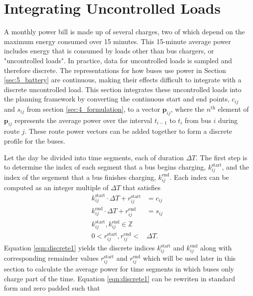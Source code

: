 \section{Integrating Uncontrolled Loads\label{sec:uncontrolled}}
A monthly power bill is made up of several charges, two of which depend on the maximum energy consumed over 15 minutes. This 15-minute average power includes energy that is consumed by loads other than bus chargers, or "uncontrolled loads". In practice, data for uncontrolled loads is sampled and therefore discrete. The representations for how buses use power in Section \ref{sec:5_battery} are continuous, making their effects difficult to integrate with a discrete uncontrolled load. This section integrates these uncontrolled loads into the planning framework by converting the continuous start and end points, $c_{ij}$ and $s_{ij}$ from section \ref{sec:4_formulation}, to a vector $\mathbf{p}_{ij}$, where the $n^{\text{th}}$ element of $\mathbf{p}_{ij}$ represents the average power over the interval $t_{i-1}$ to $t_i$ from bus $i$ during route $j$. These route power vectors can be added together to form a discrete profile for the buses.
\par Let the day be divided into time segments, each of duration $\Delta T$. The first step is to determine the index of each segment that a bus begins charging, $k_{ij}^{\text{start}}$, and the index of the segement that a bus finishes charging, $k_{ij}^{\text{end}}$.  Each index can be computed as an integer multiple of $\Delta T$ that satisfies 
\begin{equation} \label{eqn:discrete1} \begin{aligned}
		k^{\text{start}}_{ij}\cdot\Delta T + r^{\text{start}}_{ij}&= c_{ij} \\
		k^{\text{end}}_{ij}\cdot\Delta T + r^{\text{end}}_{ij}&= s_{ij} \\
	k^{\text{start}}_{ij}, k^{\text{end}}_{ij} \in \mathbb{Z} \\
	0 < r^{\text{start}}_{ij}, r^{\text{end}}_{ij} < &\Delta T.
\end{aligned} \end{equation} 
Equation \eqref{eqn:discrete1} yields the discrete indices $k_{ij}^{\text{start}}$ and $k_{ij}^{\text{end}}$ along with corresponding remainder values $r_{ij}^{\text{start}}$ and $r_{ij}^{\text{end}}$ which will be used later in this section to calculate the average power for time segments in which buses only charge part of the time.  Equation \ref{eqn:discrete1} can be rewriten in standard form and zero padded such that
